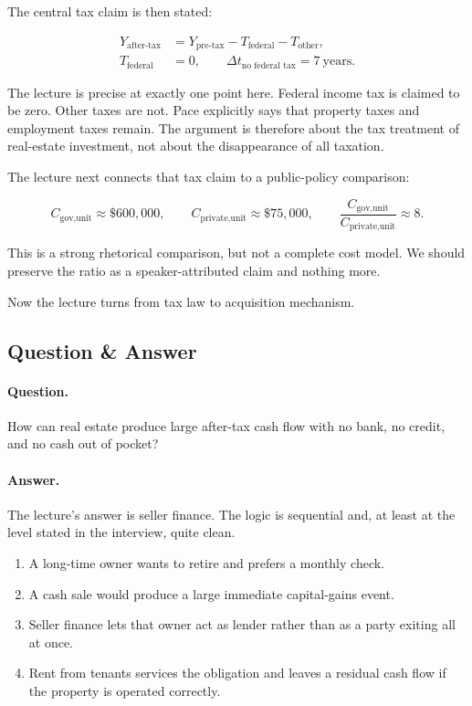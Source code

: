 The central tax claim is then stated:

\begin{align}
Y_{\text{after-tax}}&=Y_{\text{pre-tax}}-T_{\text{federal}}-T_{\text{other}},\\
T_{\text{federal}}&=0,
\qquad
\Delta t_{\text{no federal tax}}=7\ \text{years}.
\end{align}

\begin{remark}
The lecture is precise at exactly one point here. Federal income tax is claimed to be zero. Other taxes are not. Pace explicitly says that property taxes and employment taxes remain. The argument is therefore about the tax treatment of real-estate investment, not about the disappearance of all taxation.
\end{remark}

The lecture next connects that tax claim to a public-policy comparison:

\begin{equation}
C_{\text{gov,unit}}\approx \$600{,}000,
\qquad
C_{\text{private,unit}}\approx \$75{,}000,
\qquad
\frac{C_{\text{gov,unit}}}{C_{\text{private,unit}}}\approx 8.
\end{equation}

This is a strong rhetorical comparison, but not a complete cost model. We should preserve the ratio as a speaker-attributed claim and nothing more.

Now the lecture turns from tax law to acquisition mechanism.

\subsection{Question \& Answer}

\paragraph{Question.} How can real estate produce large after-tax cash flow with no bank, no credit, and no cash out of pocket?

\paragraph{Answer.} The lecture's answer is seller finance. The logic is sequential and, at least at the level stated in the interview, quite clean.

\begin{enumerate}
\item A long-time owner wants to retire and prefers a monthly check.
\item A cash sale would produce a large immediate capital-gains event.
\item Seller finance lets that owner act as lender rather than as a party exiting all at once.
\item Rent from tenants services the obligation and leaves a residual cash flow if the property is operated correctly.
\end{enumerate}

